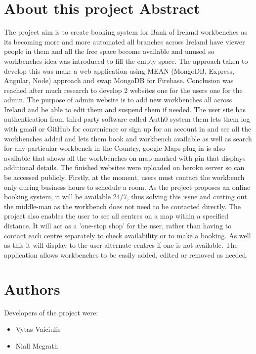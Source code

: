\chapter*{About this project Abstract}

\bigbreak
The project aim is to create booking system for Bank of Ireland workbenches as its becoming more and more automated all branches across Ireland have viewer people in them and all the free space become available and unused so workbenches idea was introduced to fill the empty space. The approach taken to develop this was make a web application using MEAN (MongoDB, Express, Angular, Node) approach
and swap MongoDB for Firebase. Conclusion was reached after much research to develop 2 websites one for the users one for the admin. The purpose of admin website is to add new workbenches all across Ireland and be able to edit them and suspend them if needed. The user site has authentication from third party software called Auth0 system them lets them log with gmail or GitHub for convenience or sign up for an account in and see all the workbenches added and lets them book and workbench available as well as search for any particular workbench in the Country, google Maps plug in is also available that shows all the workbenches on map marked with pin that displays additional details. The finished websites were uploaded on heroku server so can be accessed publicly.
Firstly, at the moment, users must contact the workbench only during business hours to schedule a room. As the project proposes an online booking system, it will be available 24/7, thus solving this issue and cutting out the middle-man as the workbench does not need to be contacted directly.
The project also enables the user to see all centres on a map within a specified distance. It will act as a 'one-stop shop' for the user, rather than having to contact each centre separately to check availability or to make a booking. As well as this it will display to the user alternate centres if one is not available. The application allows workbenches to be easily added, edited or removed as needed.


\chapter*{Authors}
Developers of the project were:
\bigbreak

\begin{itemize}
	\item Vytas Vaiciulis 
	\item Niall Mcgrath 
\end{itemize}


